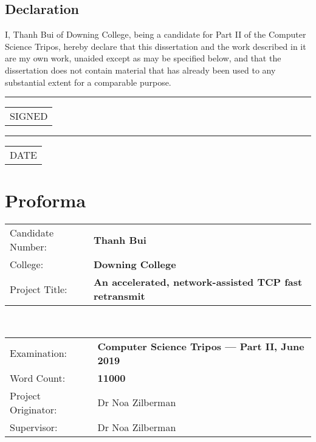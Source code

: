 \section*{Declaration}

I, Thanh Bui of Downing College, being a candidate for Part II of the Computer Science Tripos, hereby declare that this dissertation and the work described in it are my own work, unaided except as may be specified below, and that the dissertation does not contain material that has already been used to any substantial extent for a comparable purpose.

\begin{minipage}[t]{0.4\textwidth}
	\vspace*{1.5cm}  %
	\hrule
	\vspace{1mm} %
	\begin{tabular}[t]{l}
		SIGNED
	\end{tabular}
\end{minipage} 
\hspace{2cm}
\begin{minipage}[t]{0.4\textwidth}
	\vspace*{1.5cm}  %
	\hrule
	\vspace{1mm} %
	\begin{tabular}[t]{l}
		DATE
	\end{tabular}
\end{minipage}

\chapter*{Proforma}

{\large
\begin{tabular}{ l@{\hskip 3.25em} p{11cm}}
	Candidate Number:               & \bf Thanh Bui \\
	College:            & \bf Downing College \\
	Project Title:      & \bf An accelerated, network-assisted TCP fast retransmit \\
\end{tabular}
}
\\
{\large
\begin{tabular}{ l p{11.5cm}}
	Examination:        & \bf Computer Science Tripos --- Part II, June 2019  \\
	Word Count:         & \bf 11000\footnotemark	 \\
	Project Originator: & Dr Noa Zilberman               \\
	Supervisor:         & Dr Noa Zilberman             		\\ 
\end{tabular}
}

